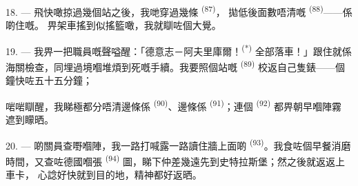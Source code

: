 18. --- 飛快噉掠過幾個站之後，我哋穿過幾條 \textsuperscript{(87)}，
拋低後面數唔清嘅 \textsuperscript{(88)}——係啲住嘅。
畀架車搖到似搖籃噉，我就瞓咗個大覺。

\VUsaut{3.0mm}
\VUsaut{3.0mm}

19. --- 我畀一把職員嘅聲嗌醒：「德意志－阿夫里庫爾！\textsuperscript{(*)}
全部落車！」跟住就係海關檢查，同埋過境嗰堆煩到死嘅手續。我要照個站嘅
 \textsuperscript{(89)} 校返自己隻錶——個鐘快咗五十五分鐘；

啱啱瞓醒，我睇極都分唔清邊條係 \textsuperscript{(90)}、邊條係
 \textsuperscript{(91)}；連個 \textsuperscript{(92)} 都畀朝早嗰陣霧
遮到矇晒。

20. --- 啲關員查嘢嗰陣，我一路打喊露一路讀住牆上面啲
\textsuperscript{(93)}。我食咗個早餐消磨時間，又查咗德國嗰張
\textsuperscript{(94)} 圖，睇下仲差幾遠先到史特拉斯堡；然之後就返返上車卡，
心諗好快就到目的地，精神都好返晒。

\VUsaut{6.0mm}
\VUfilet{22mm}
